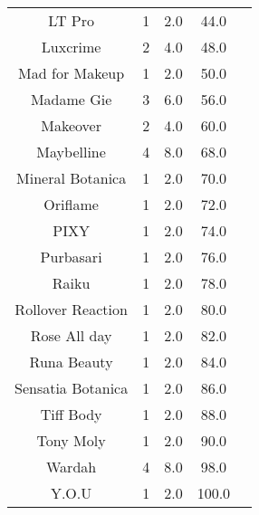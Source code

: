 \begin{table}[htb!]
\begin{tabular}{ccccc}
        LT Pro            & 1                  & 2.0                 & 44.0                           \\
        Luxcrime          & 2                  & 4.0                 & 48.0                           \\
        Mad for Makeup    & 1                  & 2.0                 & 50.0                           \\
        Madame Gie        & 3                  & 6.0                 & 56.0                           \\
        Makeover          & 2                  & 4.0                 & 60.0                           \\
        Maybelline        & 4                  & 8.0                 & 68.0                           \\
        Mineral Botanica  & 1                  & 2.0                 & 70.0                           \\
        Oriflame          & 1                  & 2.0                 & 72.0                           \\
        PIXY              & 1                  & 2.0                 & 74.0                           \\
        Purbasari         & 1                  & 2.0                 & 76.0                           \\
        Raiku             & 1                  & 2.0                 & 78.0                           \\
        Rollover Reaction & 1                  & 2.0                 & 80.0                           \\
        Rose All day      & 1                  & 2.0                 & 82.0                           \\
        Runa Beauty       & 1                  & 2.0                 & 84.0                           \\
        Sensatia Botanica & 1                  & 2.0                 & 86.0                           \\
        Tiff Body         & 1                  & 2.0                 & 88.0                           \\
        Tony Moly         & 1                  & 2.0                 & 90.0                           \\
        Wardah            & 4                  & 8.0                 & 98.0                           \\
        Y.O.U             & 1                  & 2.0                 & 100.0                          \\
    \end{tabular}
\end{table}
